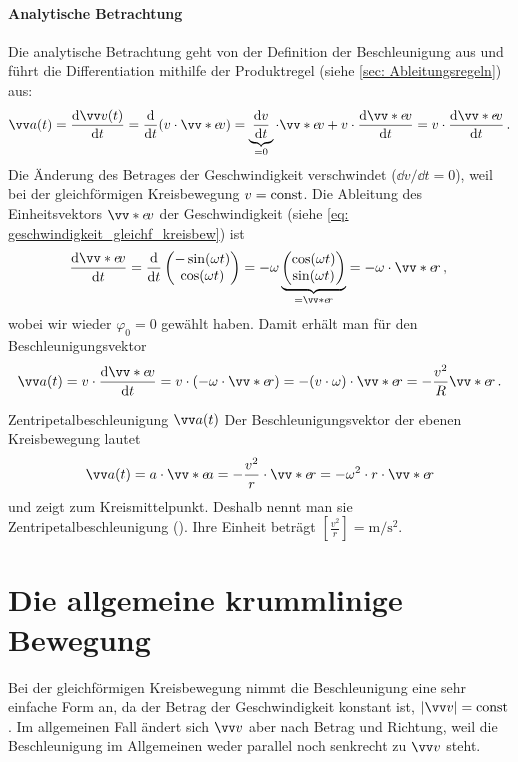 \paragraph{Analytische Betrachtung}
Die analytische Betrachtung geht von der Definition der Beschleunigung aus und führt die Differentiation mithilfe der Produktregel (siehe \cref{sec: Ableitungsregeln}) aus:
\begin{equation}
    \ivec{a}(t) = \frac{\dd \ivec{v}(t)}{\dd t} = \frac{\dd}{\dd t}(v \cdot \ivecS{e}{v}) = \underbrace{\frac{\dd v}{\dd t}}_{=0} \cdot \ivecS{e}{v} + v \cdot \frac{\dd \ivecS{e}{v}}{\dd t} = v \cdot \frac{\dd \ivecS{e}{v}}{\dd t} \mDot
\end{equation}
Die Änderung des Betrages der Geschwindigkeit verschwindet ($\dd v/\dd t = 0$), weil bei der gleichförmigen Kreisbewegung $v = \mathrm{const}$. 
Die Ableitung des Einheitsvektors $\ivecS{e}{v}$ der Geschwindigkeit (siehe \cref{eq: geschwindigkeit_gleichf_kreisbew}) ist
\begin{equation}
    \frac{\dd \ivecS{e}{v}}{\dd t} = \frac{\dd}{\dd t} \icolTwo{-\sin(\omega t)}{\cos(\omega t)} = -\omega \underbrace{\icolTwo{\cos(\omega t)}{\sin(\omega t)}}_{= \ivecS{e}{r}}  = -\omega \cdot \ivecS{e}{r} \mComma
\end{equation}
wobei wir wieder \oBdA $\varphi_0 = 0$ gewählt haben. Damit erhält man für den Beschleunigungsvektor
\begin{equation}
    \ivec{a}(t) = v \cdot \frac{\dd \ivecS{e}{v}}{\dd t} = v \cdot (-\omega \cdot \ivecS{e}{r}) = -(v \cdot \omega) \cdot \ivecS{e}{r} = - \frac{v^2}{R} \ivecS{e}{r}\mDot
\end{equation}
\begin{importantbox}{Zentripetalbeschleunigung $\ivec{a}(t)$}
    Der Beschleunigungsvektor der ebenen Kreisbewegung lautet
    $$ \ivec{a}(t) = a \cdot \ivecS{e}{a} = -\frac{v^2}{r} \cdot \ivecS{e}{r} = -\omega^2 \cdot r \cdot \ivecS{e}{r} $$
    und zeigt zum Kreismittelpunkt. Deshalb nennt man sie Zentripetalbeschleunigung (). Ihre Einheit beträgt $[\frac{v^2}{r}] = \si{\meter\per\second\squared}$.
\end{importantbox}

\section{Die allgemeine krummlinige Bewegung}
Bei der gleichförmigen Kreisbewegung nimmt die Beschleunigung eine sehr einfache Form an, da der Betrag der Geschwindigkeit konstant ist, $|\ivec{v}| = \const$. Im allgemeinen Fall ändert sich $\ivec{v}$ aber nach Betrag und Richtung, weil die Beschleunigung im Allgemeinen weder parallel noch senkrecht zu $\ivec{v}$ steht. \\

